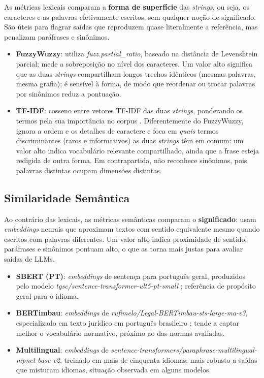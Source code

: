 As métricas lexicais comparam a \textbf{forma de superfície} das \textit{strings}, ou seja, os caracteres e as palavras efetivamente escritos, sem qualquer noção de significado. São úteis para flagrar saídas que reproduzem quase literalmente a referência, mas penalizam paráfrases e sinônimos.

\begin{itemize}
    \item \textbf{FuzzyWuzzy}: utiliza \textit{fuzz.partial\_ratio}, baseado na distância de Levenshtein parcial; mede a sobreposição no nível dos caracteres. Um valor alto significa que as duas \textit{strings} compartilham longos trechos idênticos (mesmas palavras, mesma grafia); é sensível à forma, de modo que reordenar ou trocar palavras por sinônimos reduz a pontuação.
    \item \textbf{TF-IDF}: cosseno entre vetores TF-IDF das duas \textit{strings}, ponderando os termos pela sua importância no corpus \cite{manning2008}. Diferentemente do FuzzyWuzzy, ignora a ordem e os detalhes de caractere e foca em \textit{quais} termos discriminantes (raros e informativos) as duas \textit{strings} têm em comum: um valor alto indica vocabulário relevante compartilhado, ainda que a frase esteja redigida de outra forma. Em contrapartida, não reconhece sinônimos, pois palavras distintas ocupam dimensões distintas.
\end{itemize}

\subsection{Similaridade Semântica}

Ao contrário das lexicais, as métricas semânticas comparam o \textbf{significado}: usam \textit{embeddings} neurais que aproximam textos com sentido equivalente mesmo quando escritos com palavras diferentes. Um valor alto indica proximidade de sentido; paráfrases e sinônimos pontuam alto, o que as torna mais justas para avaliar saídas de LLMs.

\begin{itemize}
    \item \textbf{SBERT (PT)}: \textit{embeddings} de sentença para português geral, produzidos pelo modelo \textit{tgsc/sentence-transformer-ult5-pt-small} \cite{reimers2019}; referência de propósito geral para o idioma.
    \item \textbf{BERTimbau}: \textit{embeddings} de \textit{rufimelo/Legal-BERTimbau-sts-large-ma-v3}, especializado em texto jurídico em português brasileiro \cite{souza2020}; tende a captar melhor o vocabulário normativo, próximo ao das normas avaliadas.
    \item \textbf{Multilingual}: \textit{embeddings} de \textit{sentence-transformers/paraphrase-multilingual-mpnet-base-v2}, treinado em mais de cinquenta idiomas; mais robusto a saídas que misturam idiomas, situação observada em alguns modelos.
\end{itemize}

